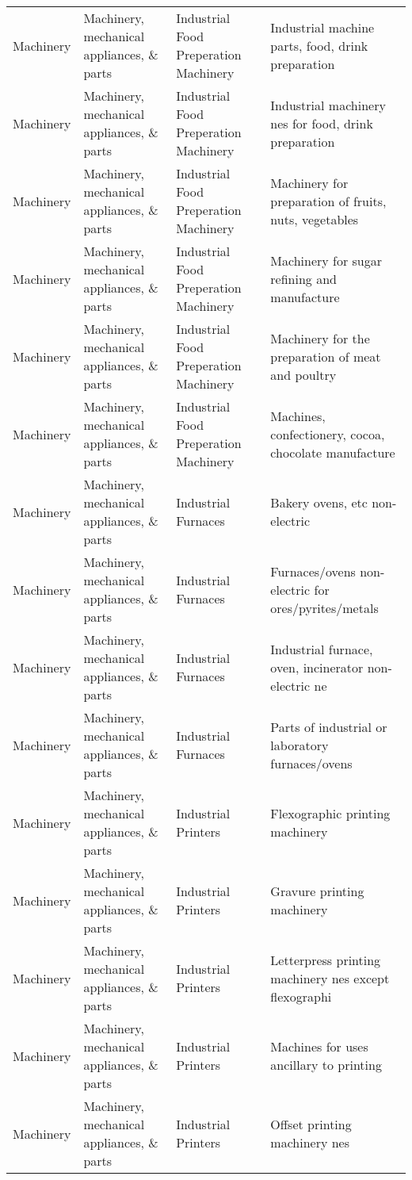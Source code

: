 \begin{appendices}
\begin{xltabular}{\textwidth}{|p{0.07\textwidth}|p{0.25\textwidth}|p{0.28\textwidth}|p{0.3\textwidth}|}
		Machinery & Machinery, mechanical appliances, \& parts & Industrial Food Preperation Machinery & Industrial machine parts, food, drink preparation \\
		Machinery & Machinery, mechanical appliances, \& parts & Industrial Food Preperation Machinery & Industrial machinery nes for food, drink preparation \\
		Machinery & Machinery, mechanical appliances, \& parts & Industrial Food Preperation Machinery & Machinery for preparation of fruits, nuts, vegetables \\
		Machinery & Machinery, mechanical appliances, \& parts & Industrial Food Preperation Machinery & Machinery for sugar refining and manufacture \\
		Machinery & Machinery, mechanical appliances, \& parts & Industrial Food Preperation Machinery & Machinery for the preparation of meat and poultry \\
		Machinery & Machinery, mechanical appliances, \& parts & Industrial Food Preperation Machinery & Machines, confectionery, cocoa, chocolate manufacture \\
		Machinery & Machinery, mechanical appliances, \& parts & Industrial Furnaces & Bakery ovens, etc non-electric \\
		Machinery & Machinery, mechanical appliances, \& parts & Industrial Furnaces & Furnaces/ovens non-electric for ores/pyrites/metals \\
		Machinery & Machinery, mechanical appliances, \& parts & Industrial Furnaces & Industrial furnace, oven, incinerator non-electric ne \\
		Machinery & Machinery, mechanical appliances, \& parts & Industrial Furnaces & Parts of industrial or laboratory furnaces/ovens \\
		Machinery & Machinery, mechanical appliances, \& parts & Industrial Printers & Flexographic printing machinery \\
		Machinery & Machinery, mechanical appliances, \& parts & Industrial Printers & Gravure printing machinery \\
		Machinery & Machinery, mechanical appliances, \& parts & Industrial Printers & Letterpress printing machinery nes except flexographi \\
		Machinery & Machinery, mechanical appliances, \& parts & Industrial Printers & Machines for uses ancillary to printing \\
		Machinery & Machinery, mechanical appliances, \& parts & Industrial Printers & Offset printing machinery nes \\

\end{xltabular}
\end{appendices}
